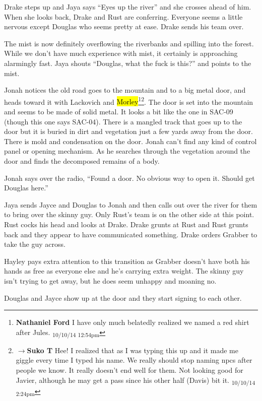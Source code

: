 Drake steps up and Jaya says ``Eyes up the river'' and she crosses ahead of him.  When she looks back, Drake and Rust are conferring.  Everyone seems a little nervous except Douglas who seems pretty at ease.  Drake sends his team over.  

The mist is now definitely overflowing the riverbanks and spilling into the forest.  While we don't have much experience with mist, it certainly is approaching alarmingly fast.  Jaya shouts ``Douglas, what the fuck is this?'' and points to the mist.



Jonah notices the old road goes to the mountain and to a big metal door, and heads toward it with Lackovich and \hl{Morley}\footnote{\textbf{Nathaniel Ford }I have only much belatedly realized we named a red shirt after Jules. \textsubscript{10/10/14 12:54pm}}\footnote{$\rightarrow$\textbf{Suko T }Hee!  I realized that as I was typing this up and it made me giggle every time I typed his name.  We really should stop naming npcs after people we know.  It really doesn't end well for them.  Not looking good for Javier, although he may get a pass since his other half (Davis) bit it. \textsubscript{10/10/14 2:24pm}}.  The door is set into the mountain and seems to be made of solid metal.  It looks a bit like the one in SAC-09 (though this one says SAC-04).  There is a mangled track that goes up to the door but it is buried in dirt and vegetation just a few yards away from the door.  There is mold and condensation on the door.  Jonah can't find any kind of control panel or opening mechanism.  As he searches through the vegetation around the door and finds the decomposed remains of a body.

Jonah says over the radio, ``Found a door.  No obvious way to open it.  Should get Douglas here.''

Jaya sends Jayce and Douglas to Jonah and then calls out over the river for them to bring over the skinny guy.  Only Rust's team is on the other side at this point.  Rust cocks his head and looks at Drake.  Drake grunts at Rust and Rust grunts back and they appear to have communicated something.  Drake orders Grabber to take the guy across.

Hayley pays extra attention to this transition as Grabber doesn't have both his hands as free as everyone else and he's carrying extra weight.  The skinny guy isn't trying to get away, but he does seem unhappy and moaning no.

Douglas and Jayce show up at the door and they start signing to each other.  

